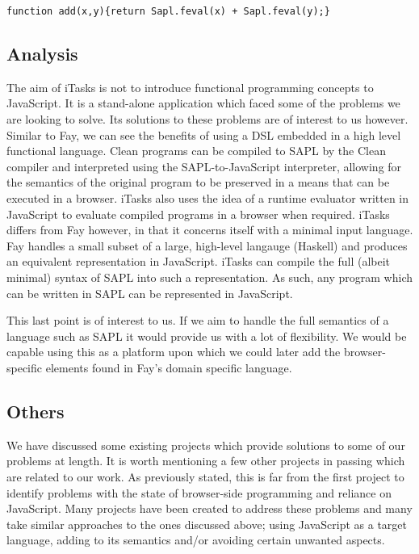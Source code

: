 \begin{center}
  \verb!function add(x,y){return Sapl.feval(x) + Sapl.feval(y);}!
\end{center}

\subsection{Analysis}
The aim of iTasks is not to introduce functional programming concepts
to JavaScript. It is a stand-alone application which faced some of the
problems we are looking to solve. Its solutions to these problems are
of interest to us however. Similar to Fay, we can see the benefits of using a
DSL embedded in a high level functional language. Clean programs can
be compiled to SAPL by the Clean compiler and interpreted using the
SAPL-to-JavaScript interpreter, allowing for the semantics of the
original program to be preserved in a means that can be executed in
a browser. iTasks also uses the idea of a runtime evaluator written
in JavaScript to evaluate compiled programs in a browser when required.
iTasks differs from Fay however, in that it concerns itself with a 
minimal input language. Fay handles a small subset of a large, high-level
langauge (Haskell) and produces an equivalent representation in JavaScript.
iTasks can compile the full (albeit minimal) syntax of SAPL into such
a representation. As such, any program which can be written in SAPL can
be represented in JavaScript. 

This last point is of interest to us. If we aim to handle the full
semantics of a language such as SAPL it would provide us with a
lot of flexibility. We would be capable using this as a platform
upon which we could later add the browser-specific elements found
in Fay's domain specific language. 

\subsection{Others}
We have discussed some existing projects which provide solutions to 
some of our problems at length. It is worth mentioning a few other 
projects in passing which are related to our work. As previously stated,
this is far from the first project to identify problems with the state
of browser-side programming and reliance on JavaScript. Many projects
have been created to address these problems and many take similar 
approaches to the ones discussed above; using JavaScript as a target
language, adding to its semantics and/or avoiding certain unwanted 
aspects.


